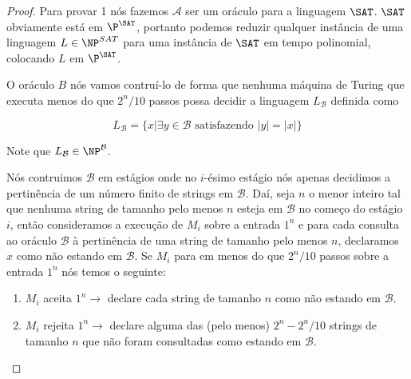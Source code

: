 \begin{proof}

Para provar 1 nós fazemos $\mathcal{A}$ ser um oráculo para a linguagem $\SAT$. $\SAT$ obviamente está em $\P^{\SAT}$, portanto podemos reduzir qualquer instância de uma linguagem $L \in \NP^{SAT}$ para uma instância de $\SAT$ em tempo polinomial, colocando $L$ em $\P^{\SAT}$.

O oráculo $B$ nós vamos contruí-lo de forma que nenhuma máquina de Turing que executa menos do que $2^{n}/10$ passos possa decidir a linguagem $L_{\mathcal{B}}$ definida como

\begin{equation*}
    L_{\mathcal{B}} = \{x \lvert \exists y \in \mathcal{B} \text{ satisfazendo } \lvert y \rvert = \lvert x \rvert \}
\end{equation*}

Note que $L_{\mathcal{B}} \in \NP^{\mathcal{B}}$.

Nós contruimos $\mathcal{B}$ em estágios onde no $i$-ésimo estágio nós apenas decidimos a pertinência de um número finito de strings em $\mathcal{B}$. Daí, seja $n$ o menor inteiro tal que nenhuma string de tamanho pelo menos $n$ esteja em $\mathcal{B}$ no começo do estágio $i$, então consideramos a execução de $M_{i}$ sobre a entrada $1^{n}$ e para cada consulta ao oráculo $\mathcal{B}$ à pertinência de uma string de tamanho pelo menos $n$, declaramos $x$ como não estando em $\mathcal{B}$. Se $M_{i}$ para em menos do que $2^{n}/10$ passos sobre a entrada $1^{n}$ nós temos o seguinte:

\begin{enumerate}

    \item $M_{i}$ aceita $1^{n} \rightarrow$ declare cada string de tamanho $n$ como não estando em $\mathcal{B}$.

    \item $M_{i}$ rejeita $1^{n} \rightarrow$ declare alguma das (pelo menos) $2^{n} - 2^{n}/10$ strings de tamanho $n$ que não foram consultadas como estando em $\mathcal{B}$.

\end{enumerate} 

\end{proof}


